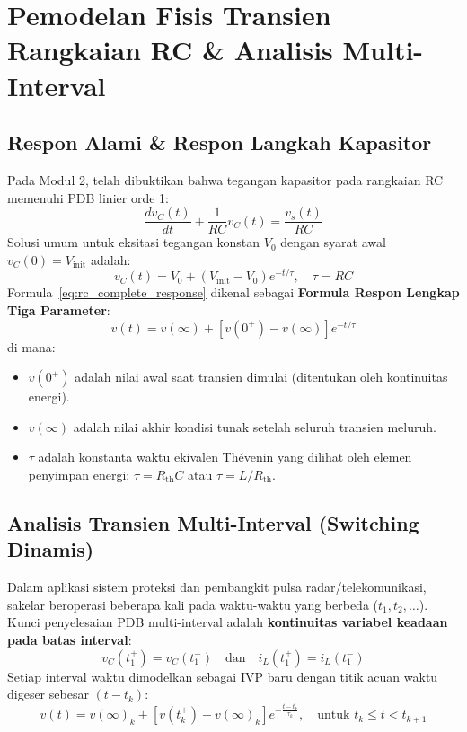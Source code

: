 \documentclass[11pt,a4paper]{article}
\theoremstyle{definition}
\begin{document}
\section{Pemodelan Fisis Transien Rangkaian RC \& Analisis Multi-Interval}

\subsection{Respon Alami \& Respon Langkah Kapasitor}

Pada Modul 2, telah dibuktikan bahwa tegangan kapasitor pada rangkaian RC memenuhi PDB linier orde 1:
\begin{equation}
    \frac{dv_C(t)}{dt} + \frac{1}{RC} v_C(t) = \frac{v_s(t)}{RC}
    \label{eq:rc_standard_diff}
\end{equation}
Solusi umum untuk eksitasi tegangan konstan $V_0$ dengan syarat awal $v_C(0) = V_{\text{init}}$ adalah:
\begin{equation}
    v_C(t) = V_0 + (V_{\text{init}} - V_0) e^{-t/\tau}, \quad \tau = RC
    \label{eq:rc_complete_response}
\end{equation}
Formula~\eqref{eq:rc_complete_response} dikenal sebagai \textbf{Formula Respon Lengkap Tiga Parameter}:
\begin{equation}
    v(t) = v(\infty) + \left[ v(0^+) - v(\infty) \right] e^{-t/\tau}
    \label{eq:three_parameter_formula}
\end{equation}
di mana:
\begin{itemize}[leftmargin=*]
    \item $v(0^+)$ adalah nilai awal saat transien dimulai (ditentukan oleh kontinuitas energi).
    \item $v(\infty)$ adalah nilai akhir kondisi tunak setelah seluruh transien meluruh.
    \item $\tau$ adalah konstanta waktu ekivalen Thévenin yang dilihat oleh elemen penyimpan energi: $\tau = R_{\text{th}} C$ atau $\tau = L / R_{\text{th}}$.
\end{itemize}

\subsection{Analisis Transien Multi-Interval (Switching Dinamis)}

Dalam aplikasi sistem proteksi dan pembangkit pulsa radar/telekomunikasi, sakelar beroperasi beberapa kali pada waktu-waktu yang berbeda ($t_1, t_2, \dots$). Kunci penyelesaian PDB multi-interval adalah \textbf{kontinuitas variabel keadaan pada batas interval}:
\begin{equation}
    v_C(t_1^+) = v_C(t_1^-) \quad \text{dan} \quad i_L(t_1^+) = i_L(t_1^-)
\end{equation}
Setiap interval waktu dimodelkan sebagai IVP baru dengan titik acuan waktu digeser sebesar $(t - t_k)$:
\begin{equation}
    v(t) = v(\infty)_k + \left[ v(t_k^+) - v(\infty)_k \right] e^{-\frac{t - t_k}{\tau_k}}, \quad \text{untuk } t_k \le t < t_{k+1}
\end{equation}
\end{document}
